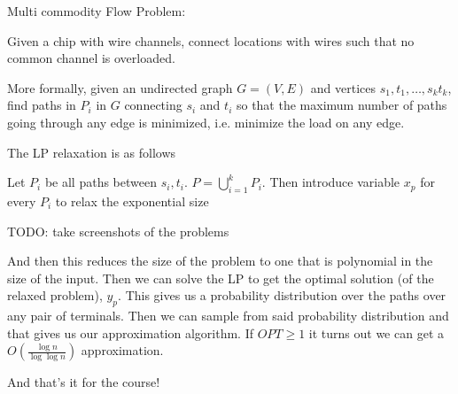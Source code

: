 \documentclass[../notes.tex]{subfiles}
\begin{document}
\begin{example}
    Multi commodity Flow Problem:

    Given a chip with wire channels, connect locations with wires such that no common channel is overloaded.

    More formally, given an undirected graph $ G = (V, E) $ and vertices $ s_1, t_1, \ldots, s_k t_k$, find paths in $ P_i $ in $ G $ connecting $ s_i $ and $ t_i $ so that the maximum number of paths going through any edge is minimized, i.e. minimize the load on any edge.
\end{example}

The LP relaxation is as follows

Let $ P_i $ be all paths between $ s_i, t_i $. $ P = \bigcup^k_{i=1} P_i $.
Then introduce variable $ x_p $ for every $ P_i $ to relax the exponential size

TODO: take screenshots of the problems

And then this reduces the size of the problem to one that is polynomial in the size of the input. 
Then we can solve the LP to get the optimal solution (of the relaxed problem), $ y_p $.
This gives us a probability distribution over the paths over any pair of terminals. Then we can sample from said probability distribution and that gives us our approximation algorithm.
If $ OPT \ge 1 $ it turns out we can get a $ O(\frac{\log n}{ \log \log n }) $ approximation.






\begin{blockquote}
    And that's it for the course!
\end{blockquote}
\end{document}
